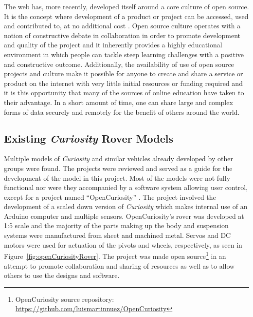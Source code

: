       The web has, more recently, developed itself around a core culture of open source. It is the concept where development of a product or project can be accessed, used and contributed to, at no additional cost \cite{2_monago_2014}. Open source culture operates with a notion of constructive debate in collaboration in order to promote development and quality of the project and it inherently provides a highly educational environment in which people can tackle steep learning challenges with a positive and constructive outcome. Additionally, the availability of use of open source projects and culture make it possible for anyone to create and share a service or product on the internet with very little initial resources or funding required and it is this opportunity that many of the sources of online education have taken to their advantage. In a short amount of time, one can share large and complex forms of data securely and remotely for the benefit of others around the world.
    
    \subsection{Existing \textit{Curiosity} Rover Models}
      Multiple models of \textit{Curiosity} and similar vehicles already developed by other groups were found. The projects were reviewed and served as a guide for the development of the model in this project. Most of the models were not fully functional nor were they accompanied by a software system allowing user control, except for a project named ``OpenCuriosity'' \cite{opencuriosity2014}. The project involved the development of a scaled down version of \textit{Curiosity} which makes internal use of an Arduino computer and multiple sensors. OpenCuriosity's rover was developed at 1:5 scale and the majority of the parts making up the body and suspension systems were manufactured from sheet and machined metal. Servos and DC motors were used for actuation of the pivots and wheels, respectively, as seen in Figure~\ref{fig:openCuriosityRover}. The project was made open source\footnote{OpenCuriosity source repository: \url{https://github.com/luismartinnuez/OpenCuriosity}} in an attempt to promote collaboration and sharing of resources as well as to allow others to use the designs and software.
      

